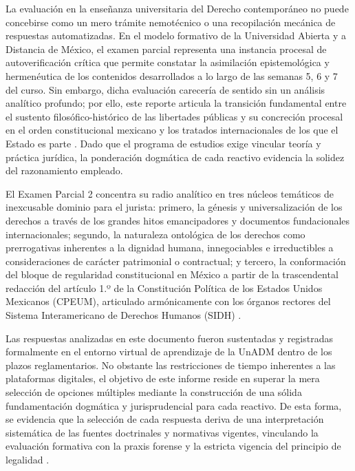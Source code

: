 \documentclass[12pt,spanish,letterpaper,oneside]{article}
\begin{document}
La evaluaci\'on en la ense\~nanza universitaria del Derecho contempor\'aneo no puede concebirse como un mero tr\'amite nemot\'ecnico o una recopilaci\'on mec\'anica de respuestas automatizadas. En el modelo formativo de la Universidad Abierta y a Distancia de M\'exico, el examen parcial representa una instancia procesal de autoverificaci\'on cr\'itica que permite constatar la asimilaci\'on epistemol\'ogica y hermen\'eutica de los contenidos desarrollados a lo largo de las semanas 5, 6 y 7 del curso. Sin embargo, dicha evaluaci\'on carecer\'ia de sentido sin un an\'alisis anal\'itico profundo; por ello, este reporte articula la transici\'on fundamental entre el sustento filos\'ofico-hist\'orico de las libertades p\'ublicas y su concreci\'on procesal en el orden constitucional mexicano y los tratados internacionales de los que el Estado es parte \citep{alvarezIcaza2009ADH}. Dado que el programa de estudios exige vincular teor\'ia y pr\'actica jur\'idica, la ponderaci\'on dogm\'atica de cada reactivo evidencia la solidez del razonamiento empleado.

El Examen Parcial 2 concentra su radio anal\'itico en tres n\'ucleos tem\'aticos de inexcusable dominio para el jurista: primero, la g\'enesis y universalizaci\'on de los derechos a trav\'es de los grandes hitos emancipadores y documentos fundacionales internacionales; segundo, la naturaleza ontol\'ogica de los derechos como prerrogativas inherentes a la dignidad humana, innegociables e irreductibles a consideraciones de car\'acter patrimonial o contractual; y tercero, la conformaci\'on del bloque de regularidad constitucional en M\'exico a partir de la trascendental redacci\'on del art\'iculo 1.º de la Constituci\'on Pol\'itica de los Estados Unidos Mexicanos (CPEUM), articulado arm\'onicamente con los \'organos rectores del Sistema Interamericano de Derechos Humanos (SIDH) \citep{carbonell2019, ferrajoli2001}.

Las respuestas analizadas en este documento fueron sustentadas y registradas formalmente en el entorno virtual de aprendizaje de la UnADM dentro de los plazos reglamentarios. No obstante las restricciones de tiempo inherentes a las plataformas digitales, el objetivo de este informe reside en superar la mera selecci\'on de opciones m\'ultiples mediante la construcci\'on de una s\'olida fundamentaci\'on dogm\'atica y jurisprudencial para cada reactivo. De esta forma, se evidencia que la selecci\'on de cada respuesta deriva de una interpretaci\'on sistem\'atica de las fuentes doctrinales y normativas vigentes, vinculando la evaluaci\'on formativa con la praxis forense y la estricta vigencia del principio de legalidad \citep{cpeumADH2026}.
\end{document}
